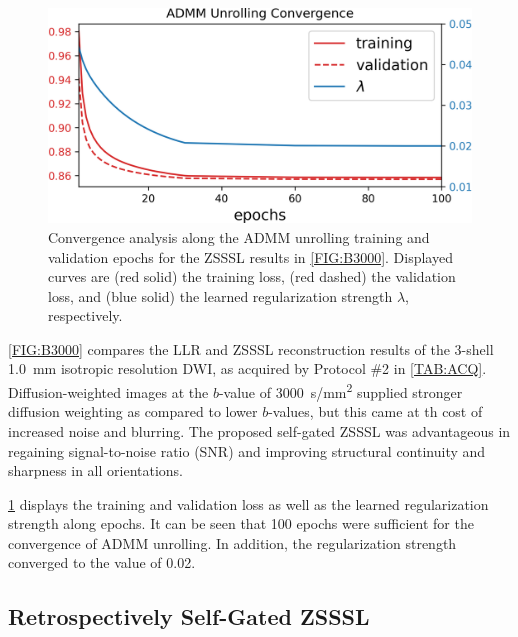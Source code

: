 \documentclass[journal,twoside,web]{ieeecolor}
\begin{document}
	\begin{figure}
		\centering
		\includegraphics[width=\columnwidth]{../figures/fig4.png}
		\caption{Convergence analysis along the ADMM unrolling training and validation epochs
			for the ZSSSL results in \cref{FIG:B3000}.
			Displayed curves are (red solid) the training loss,
			(red dashed) the validation loss,
			and (blue solid) the learned regularization strength $\lambda$, respectively.}
		\label{FIG:CONVERGENCE}
	\end{figure}

	\cref{FIG:B3000} compares the LLR and ZSSSL reconstruction results
	of the 3-shell \SI{1.0}{mm} isotropic resolution DWI,
	as acquired by Protocol \#2 in \cref{TAB:ACQ}.
	Diffusion-weighted images at the $b$-value of \SI{3000}{s/mm^2} supplied
	stronger diffusion weighting as compared to lower $b$-values,
	but this came at th cost of increased noise and blurring.
	The proposed self-gated ZSSSL was advantageous in
	regaining signal-to-noise ratio (SNR) and
	improving structural continuity and sharpness in all orientations.

	\cref{FIG:CONVERGENCE} displays the training and validation loss
	as well as the learned regularization strength along epochs.
	It can be seen that 100 epochs were sufficient for
	the convergence of ADMM unrolling.
	In addition, the regularization strength converged to the value of 0.02.



	\subsection{Retrospectively Self-Gated ZSSSL}
\end{document}
